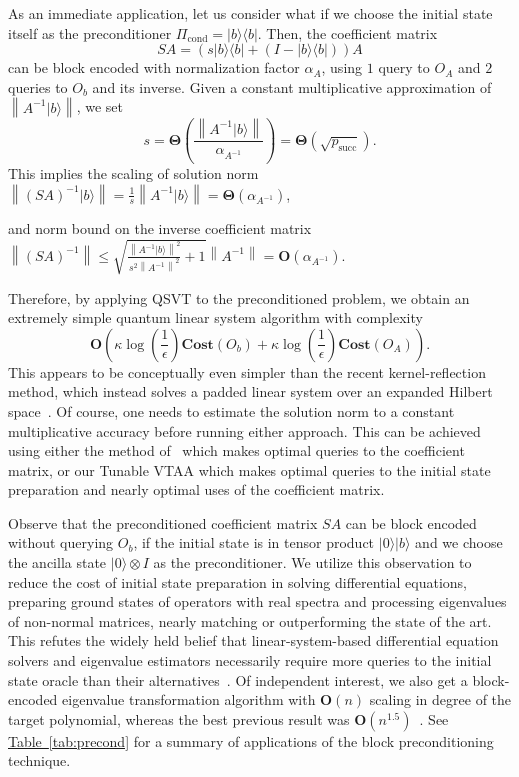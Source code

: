 \documentclass[letterpaper,onecolumn,11pt,accepted=2026-02-14]{quantumarticle}
\newcommand{\norm}[1]{\left\lVert#1\right\rVert}
\theoremstyle{remark}
\theoremstyle{plain}
\newcommand{\tab}[1]{\hyperref[tab:#1]{Table~\ref*{tab:#1}}}
\newcommand{\ket}[1]{|#1\rangle}
\newcommand{\bra}[1]{\langle#1|}
\newcommand{\ketbra}[2]{\ket{#1}\!\bra{#2}}
\begin{document}
As an immediate application, let us consider what if we choose the initial state itself as the preconditioner $\Pi_{\text{cond}}=\ketbra{b}{b}$. Then, the coefficient matrix
\begin{equation}
    SA=\left(s\ketbra{b}{b}+\left(I-\ketbra{b}{b}\right)\right)A
\end{equation}
can be block encoded with normalization factor $\alpha_A$, using $1$ query to $O_A$ and $2$ queries to $O_b$ and its inverse. Given a constant multiplicative approximation of $\norm{A^{-1}\ket{b}}$, we set
\begin{equation}
    s=\mathbf{\Theta}\left(\frac{\norm{A^{-1}\ket{b}}}{\alpha_{A^{-1}}}\right)=\mathbf{\Theta}\left(\sqrt{p_{\text{succ}}}\right).
\end{equation}
This implies the scaling of solution norm $\norm{(SA)^{-1}\ket{b}}
    =\frac{1}{s}\norm{A^{-1}\ket{b}}
    =\mathbf{\Theta}\left(\alpha_{A^{-1}}\right)$,
\addtocounter{equation}{1}%
and norm bound on the inverse coefficient matrix $\norm{(SA)^{-1}}
    \leq\sqrt{\frac{\norm{A^{-1}\ket{b}}^2}{s^2\norm{A^{-1}}^2}+1}\norm{A^{-1}}
    =\mathbf{O}\left(\alpha_{A^{-1}}\right)$.
\addtocounter{equation}{1}%
Therefore, by applying QSVT to the preconditioned problem, we obtain an extremely simple quantum linear system algorithm with complexity
\begin{equation}
    \mathbf{O}\left(\kappa\log\left(\frac{1}{\epsilon}\right)\mathbf{Cost}(O_b)
    +\kappa\log\left(\frac{1}{\epsilon}\right)\mathbf{Cost}(O_A)\right).
\end{equation}
This appears to be conceptually even simpler than the recent kernel-reflection method, which instead solves a padded linear system over an expanded Hilbert space~\cite{Dalzell2024shortcut}. Of course, one needs to estimate the solution norm to a constant multiplicative accuracy before running either approach. This can be achieved using either the method of~\cite{Dalzell2024shortcut} which makes optimal queries to the coefficient matrix, or our Tunable VTAA which makes optimal queries to the initial state preparation and nearly optimal uses of the coefficient matrix.

Observe that the preconditioned coefficient matrix $SA$ can be block encoded without querying $O_b$, if the initial state is in tensor product $\ket{0}\ket{b}$ and we choose the ancilla state $\ket{0}\otimes I$ as the preconditioner. We utilize this observation to reduce the cost of initial state preparation in solving differential equations, preparing ground states of operators with real spectra and processing eigenvalues of non-normal matrices, nearly matching or outperforming the state of the art. This refutes the widely held belief that linear-system-based differential equation solvers and eigenvalue estimators necessarily require more queries to the initial state oracle than their alternatives~\cite{Fang2023timemarchingbased,AnChildsLin23,Zhang2024Nonnormal}. Of independent interest, we also get a block-encoded eigenvalue transformation algorithm with $\mathbf{O}(n)$ scaling in degree of the target polynomial, whereas the best previous result was $\mathbf{O}(n^{1.5})$~\cite[Section 5.2]{QEVP}. See \tab{precond} for a summary of applications of the block preconditioning technique.
\end{document}
